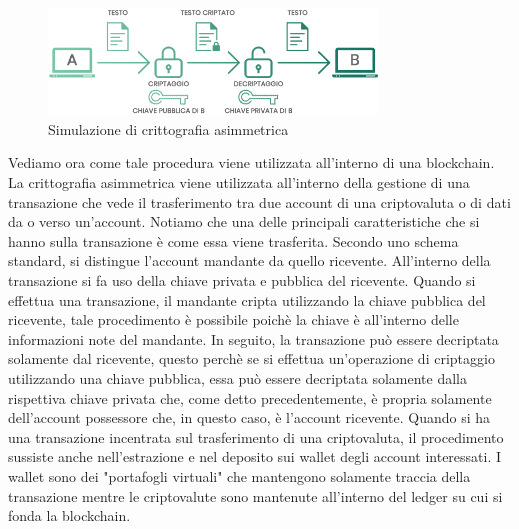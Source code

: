 \begin{figure}[h]
    \centering
    \includegraphics[width=0.78\textwidth]{img/asymmetric-cripto.png}
    \caption{Simulazione di crittografia asimmetrica}
    \label{fig:asimmetric-crypto}
\end{figure}
Vediamo ora come tale procedura viene utilizzata all'interno di una blockchain. La crittografia asimmetrica viene utilizzata all'interno della gestione di una transazione che vede il trasferimento tra due account di una criptovaluta o di dati da o verso un'account. Notiamo che una delle principali caratteristiche che si hanno sulla transazione è come essa viene trasferita. Secondo uno schema standard, si distingue l'account mandante da quello ricevente. All'interno della transazione si fa uso della chiave privata e pubblica del ricevente. Quando si effettua una transazione, il mandante cripta utilizzando la chiave pubblica del ricevente, tale procedimento è possibile poichè la chiave è all'interno delle informazioni note del mandante. In seguito, la transazione può essere decriptata solamente dal ricevente, questo perchè se si effettua un'operazione di criptaggio utilizzando una chiave pubblica, essa può essere decriptata solamente dalla rispettiva chiave privata che, come detto precedentemente, è propria solamente dell'account possessore che, in questo caso, è l'account ricevente. Quando si ha una transazione incentrata sul trasferimento di una criptovaluta, il procedimento sussiste anche nell'estrazione e nel deposito sui wallet degli account interessati. I wallet sono dei "portafogli virtuali" che mantengono solamente traccia della transazione mentre le criptovalute sono mantenute all'interno del ledger su cui si fonda la blockchain.

